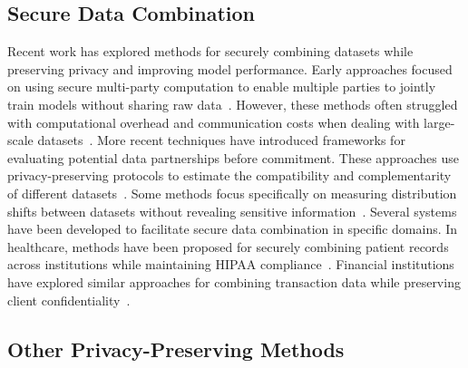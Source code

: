 \subsection{Secure Data Combination} 
Recent work has explored methods for securely combining datasets while preserving privacy and improving model performance. Early approaches focused on using secure multi-party computation to enable multiple parties to jointly train models without sharing raw data~\cite{aono2017privacy}. However, these methods often struggled with computational overhead and communication costs when dealing with large-scale datasets~\cite{mcmahan2017communication}.
More recent techniques have introduced frameworks for evaluating potential data partnerships before commitment. These approaches use privacy-preserving protocols to estimate the compatibility and complementarity of different datasets~\cite{leung2019towards,chakraborty2024privacy}. Some methods focus specifically on measuring distribution shifts between datasets without revealing sensitive information~\cite{duan2021flexible}. Several systems have been developed to facilitate secure data combination in specific domains. In healthcare, methods have been proposed for securely combining patient records across institutions while maintaining HIPAA compliance~\cite{raisaro2018m}. Financial institutions have explored similar approaches for combining transaction data while preserving client confidentiality~\cite{liu2021finbert}.


\subsection{Other Privacy-Preserving Methods}
